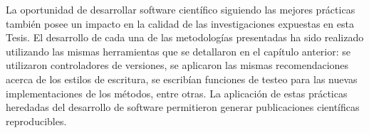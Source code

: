 La oportunidad de desarrollar software científico siguiendo las mejores
prácticas también posee un impacto en la calidad de las investigaciones
expuestas en esta Tesis.
El desarrollo de cada una de las metodologías presentadas ha sido realizado
utilizando las mismas herramientas que se detallaron en el capítulo anterior:
se utilizaron controladores de versiones, se aplicaron las mismas
recomendaciones acerca de los estilos de escritura, se escribían funciones de
testeo para las nuevas implementaciones de los métodos, entre otras.
La aplicación de estas prácticas heredadas del desarrollo de software
permitieron generar publicaciones científicas reproducibles.






